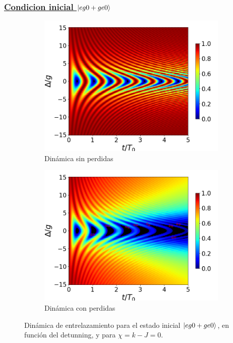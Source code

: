 \subsubsection{\underline{Condicion inicial $\ket{eg0+ge0}$}}
\begin{figure}[h]
    \centering
    \begin{subfigure}{0.49\textwidth}
        \includegraphics[width=\textwidth]{figuras/ch4/concu/delta/eg0+ge0 k=0.0g x=0.0g J=0.0g gamma=0.25g concu delta uni.png}
        \caption{Dinámica sin perdidas}
        \label{fig4:concu detunning 0 uni}
    \end{subfigure}
    \hfill
    \begin{subfigure}{0.49\textwidth}
        \includegraphics[width=\textwidth]{figuras/ch4/concu/delta/eg0+ge0 k=0.0g x=0.0g J=0.0g gamma=0.25g concu delta dis.png}
        \caption{Dinámica con perdidas}
        \label{fig4:concu detunning 0 dis}
    \end{subfigure}
    \caption{Dinámica de entrelazamiento para el estado inicial $\ket{eg0+ge0}$, en función del detunning, y para $\chi=k-J=0$.}
    \label{fig4:concu detunning 0}
\end{figure}

